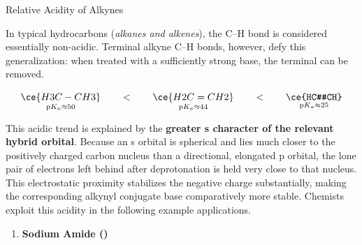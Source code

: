\documentclass[10pt]{article}
\begin{document}
  \begin{core}[label=core:alkyne_acidity]{Relative Acidity of Alkynes}

    In typical hydrocarbons (\textit{alkanes and alkenes}), the C--H bond is considered essentially non-acidic. Terminal alkyne C--H bonds, however, defy this generalization: when treated with a sufficiently strong base, the terminal  can be removed.

    \vspace{-0.6cm}
    \[
      \underset{\text{p}K_a \approx 50}{\ce{H3C-CH3}} \qquad < \qquad \underset{\text{p}K_a \approx 44}{\ce{H2C=CH2}} \qquad < \qquad \underset{\text{p}K_a \approx 25}{\ce{HC#CH}}
    \]

    This acidic trend is explained by the \textbf{greater s character of the relevant hybrid orbital}. Because an s orbital is spherical and lies much closer to the positively charged carbon nucleus than a directional, elongated p orbital, the lone pair of electrons left behind after deprotonation is held very close to that nucleus. This electrostatic proximity stabilizes the negative charge substantially, making the corresponding alkynyl conjugate base comparatively more stable. Chemists exploit this acidity in the following example applications.

    \begin{enumerate}

      \item \textbf{Sodium Amide ()}

      \vspace{-0.3cm}


\end{enumerate}
\end{core}
\end{document}
